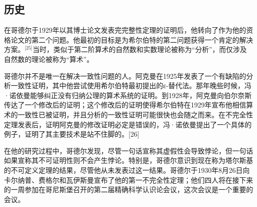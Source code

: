 \subsection{历史}  
在哥德尔于1929年以其博士论文发表完完整性定理的证明后，他转向了作为他的资格论文的第二个问题。他最初的目标是为希尔伯特的第二问题获得一个肯定的解决方案。\(^\text{[25]}\)当时，类似于第二阶算术的自然数和实数理论被称为“分析”，而仅涉及自然数的理论被称为“算术”。

哥德尔并不是唯一在解决一致性问题的人。阿克曼在1925年发表了一个有缺陷的分析一致性证明，其中他尝试使用希尔伯特最初提出的ε-替代法。那年晚些时候，冯·诺依曼能够纠正没有归纳公理的算术系统的证明。到1928年，阿克曼向伯尔奈斯传达了一个修改后的证明；这个修改后的证明使得希尔伯特在1929年宣布他相信算术的一致性已被证明，并且分析的一致性证明可能很快也会随之而来。在不完全性定理发表后，证明阿克曼的修改证明必定是错误的，冯·诺依曼提出了一个具体的例子，证明了其主要技术是站不住脚的。[26]

在他的研究过程中，哥德尔发现，尽管一句话宣称其虚假性会导致悖论，但一句话如果宣称其不可证明性则不会产生悖论。特别是，哥德尔意识到现在称为塔尔斯基的不可定义定理的结果，尽管他从未发表过这一结果。哥德尔于1930年8月26日向卡尔纳普、费格尔和瓦伊斯曼宣布了他的第一不完全性定理；他们四人将在接下来的一周参加在哥尼斯堡召开的第二届精确科学认识论会议，这次会议是一个重要的会议。
